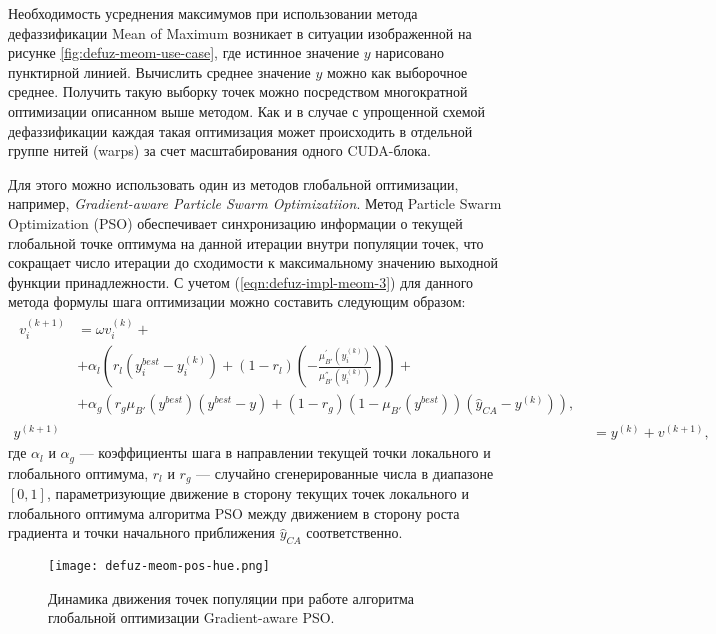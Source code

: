Необходимость усреднения максимумов при использовании метода дефаззификации Mean of Maximum возникает в ситуации изображенной на рисунке \cref{fig:defuz-meom-use-case}, где истинное значение $y$ нарисовано пунктирной линией. Вычислить среднее значение $y$ можно как выборочное среднее. Получить такую выборку точек можно посредством многократной оптимизации описанном выше методом. Как и в случае с упрощенной схемой дефаззификации каждая такая оптимизация может происходить в отдельной группе нитей (warps) за счет масштабирования одного CUDA-блока.

Для этого можно использовать один из методов глобальной оптимизации, например, \textit{Gradient-aware Particle Swarm Optimizatiion}. Метод Particle Swarm Optimization (PSO) обеспечивает синхронизацию информации о текущей глобальной точке оптимума на данной итерации внутри популяции точек, что сокращает число итерации до сходимости к максимальному значению выходной функции принадлежности. С учетом (\ref{eqn:defuz-impl-meom-3}) для данного метода формулы шага оптимизации можно составить следующим образом:
\begin{align}
	\begin{split}
		v_i^{(k+1)} &= \omega v_i^{(k)} +\\
		&+ \alpha_l \left(
			r_l\left(
				y_i^{best} - y_i^{(k)}
			\right) + (1-r_l)\left(
				-\frac{\mu_{B'}^{'}(y_i^{(k)})}{\mu_{B'}^{''}(y_i^{(k)})}
			\right)
		\right) + \\
		&+ \alpha_g \left(
			r_g \mu_{B'}(y^{best})\left(
				y^{best}-y
			\right) + (1-r_g) \left(
				1-\mu_{B'}(y^{best})
			\right) \left(
				\hat{y}_{CA} - y^{(k)}
			\right)
		\right), \label{eqn:defuz-impl-meom-4-1}
	\end{split}\\
	y^{(k+1)} &= y^{(k)} + v^{(k+1)}, \nonumber
\end{align}
где $\alpha_l$ и $\alpha_g$ --- коэффициенты шага в направлении текущей точки локального и глобального оптимума, $r_l$ и $r_g$ --- случайно сгенерированные числа в диапазоне $[0,1]$, параметризующие движение в сторону текущих точек локального и глобального оптимума алгоритма PSO между движением в сторону роста градиента и точки начального приближения $\hat{y}_{CA}$ соответственно.

\begin{figure}[ht]
	\centering
	\texttt{[image: defuz-meom-pos-hue.png]}
	\caption{Динамика движения точек популяции при работе алгоритма глобальной оптимизации Gradient-aware PSO.}
	\label{fig:defuz-meom-pso-hue}
\end{figure}

